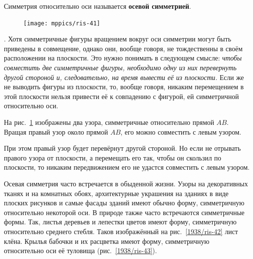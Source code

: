 Симметрия относительно оси называется \textbf{осевой симметрией}. 

\begin{figure}
\centering
\texttt{[image: mppics/ris-41]}
\caption{}\label{1938/ris-41}
\end{figure}

\smallskip
\mbox{.}
Хотя симметричные фигуры вращением вокруг оси симметрии могут быть приведены в совмещение, однако они, вообще говоря, не тождественны в своём расположении на плоскости.
Это нужно понимать в следующем смысле:
\emph{чтобы совместить две симметричные фигуры, необходимо одну из них перевернуть другой стороной и, следовательно, на время вывести её из плоскости.}
Если же не выводить фигуры из плоскости, то, вообще говоря, никаким перемещением в этой плоскости нельзя привести её к совпадению с фигурой, ей симметричной относительно оси.


На рис.~\ref{1938/ris-41} изображены два узора, симметричные относительно прямой $AB$.
Вращая правый узор около прямой $AB$, его можно совместить с левым узором.

При этом правый узор будет перевёрнут другой стороной.
Но если не отрывать правого узора от плоскости, а перемещать его так, чтобы он скользил по плоскости, то никаким передвижением его не удастся совместить с левым узором.

Осевая симметрия часто встречается в обыденной жизни.
Узоры на декоративных тканях и на комнатных обоях, архитектурные украшения на зданиях в виде плоских рисунков и самые фасады зданий имеют обычно форму, симметричную относительно некоторой оси.
В природе также часто встречаются симметричные формы.
Так, листья деревьев и лепестки цветов имеют форму, симметричную относительно среднего стебля.
Таков изображённый на рис.~\ref{1938/ris-42} лист клёна.
Крылья бабочки и их расцветка имеют форму, симметричную относительно оси её туловища (рис.~\ref{1938/ris-43}).

